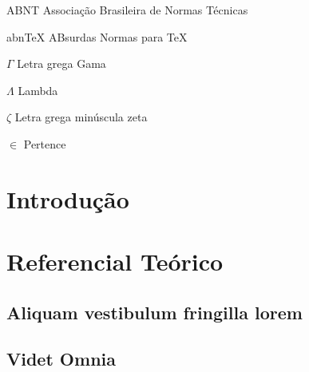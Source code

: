 \documentclass[
12pt,        %
openright,   %
twoside,     %
a4paper,     %
english,       %
brazil,        %
%
%
]{ppgca}
\begin{document}
\listoftables*
\cleardoublepage

\begin{siglas}
  \item[ABNT] Associação Brasileira de Normas Técnicas
  \item[abnTeX] ABsurdas Normas para TeX
\end{siglas}

\begin{simbolos}
  \item[$ \Gamma $] Letra grega Gama
  \item[$ \Lambda $] Lambda
  \item[$ \zeta $] Letra grega minúscula zeta
  \item[$ \in $] Pertence
\end{simbolos}

\tableofcontents*
\cleardoublepage
\textual

\chapter*[Introdução]{Introdução} %

\lipsum[1-5]

\chapter{Referencial Teórico}

\section{Aliquam vestibulum fringilla lorem}

\lipsum[8]

\section{Videt Omnia}
\end{document}
